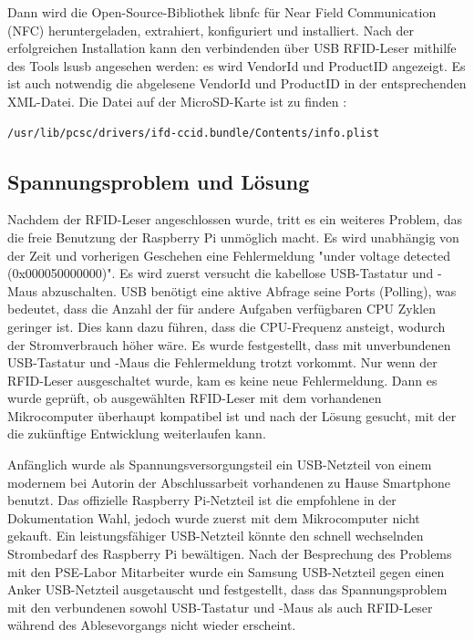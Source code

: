 Dann wird die Open-Source-Bibliothek libnfc für Near Field Communication (NFC) heruntergeladen, extrahiert, konfiguriert und installiert. Nach der erfolgreichen Installation kann den verbindenden über USB RFID-Leser mithilfe des Tools lsusb angesehen werden: es wird VendorId und ProductID angezeigt. Es ist auch notwendig die abgelesene VendorId und ProductID in der entsprechenden XML-Datei. Die Datei auf der MicroSD-Karte ist zu finden :
\begin{lstlisting}[caption={[XML-Datei für VendorId und ProductID] },captionpos=b]
/usr/lib/pcsc/drivers/ifd-ccid.bundle/Contents/info.plist
\end{lstlisting}

\subsection{Spannungsproblem und Lösung}
\label{sec:register_client:voltage_issue}
Nachdem der RFID-Leser angeschlossen wurde, tritt es ein weiteres Problem, das die freie Benutzung der Raspberry Pi unmöglich macht. Es wird unabhängig von der Zeit und vorherigen Geschehen eine Fehlermeldung "under voltage detected (0x000050000000)". Es wird zuerst versucht die kabellose USB-Tastatur und -Maus abzuschalten. USB benötigt eine aktive Abfrage seine Ports (Polling), was bedeutet, dass die Anzahl der für andere Aufgaben verfügbaren CPU Zyklen geringer ist. Dies kann dazu führen, dass die CPU-Frequenz ansteigt, wodurch der Stromverbrauch höher wäre. Es wurde festgestellt, dass mit unverbundenen USB-Tastatur und -Maus die Fehlermeldung trotzt vorkommt. Nur wenn der RFID-Leser ausgeschaltet wurde, kam es keine neue Fehlermeldung. Dann es wurde geprüft, ob ausgewählten RFID-Leser mit dem vorhandenen Mikrocomputer überhaupt kompatibel ist und nach der Lösung gesucht, mit der die zukünftige Entwicklung weiterlaufen kann.    

Anfänglich wurde als Spannungsversorgungsteil ein USB-Netzteil von einem modernem bei Autorin der Abschlussarbeit vorhandenen zu Hause Smartphone benutzt. Das offizielle Raspberry Pi-Netzteil ist die empfohlene in der Dokumentation Wahl, jedoch wurde zuerst mit dem Mikrocomputer nicht gekauft. Ein leistungsfähiger USB-Netzteil könnte den schnell wechselnden Strombedarf des Raspberry Pi bewältigen. Nach der Besprechung des Problems mit den PSE-Labor Mitarbeiter wurde ein Samsung USB-Netzteil gegen einen Anker USB-Netzteil ausgetauscht und festgestellt, dass das Spannungsproblem mit den verbundenen sowohl USB-Tastatur und -Maus als auch RFID-Leser während des Ablesevorgangs nicht wieder erscheint. 

